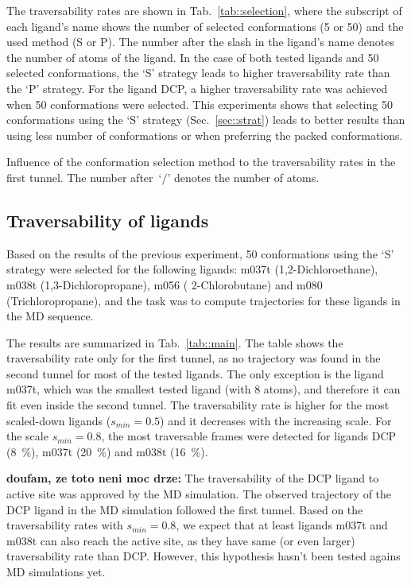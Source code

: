 \documentclass[usletter, 10pt, conference]{ieeeconf} %
\def\smin{s_{min}}
\begin{document}
The traversability rates are shown in Tab.~\ref{tab::selection}, where the subscript of each ligand's 
name shows the number of selected conformations (5 or 50) and the used method (S or P).
The number after the slash in the ligand's name denotes the number of atoms of the ligand.
In the case of both tested ligands and 50 selected conformations, the `S' strategy leads to higher traversability rate than the `P' strategy.
For the ligand DCP, a higher traversability rate was achieved when 50 conformations were selected.
This experiments shows that selecting 50 conformations using the `S' strategy (Sec.~\ref{sec::strat}) leads to better results
than using less number of conformations or when preferring the packed conformations.

\begin{table}
\centering
\caption{\label{tab::selection}
    Influence of the conformation selection method to the traversability rates in the first tunnel.
    The number after~`$/$' denotes the number of atoms.
}
\small
\renewcommand{\tabcolsep}{3pt}
{\small

}
\end{table}





\subsection{Traversability of ligands}

Based on the results of the previous experiment, 50 conformations using the `S' strategy were selected for the following
ligands: m037t (1,2-Dichloroethane), m038t (1,3-Dichloropropane), m056 ( 2-Chlorobutane) and m080 (Trichloropropane), and
the task was to compute trajectories for these ligands in the MD sequence.

The results are summarized in Tab.~\ref{tab::main}.
The table shows the traversability rate only for the first tunnel, as no trajectory was found in the second tunnel for most of the tested ligands.
The only exception is the ligand m037t, which was the smallest tested ligand (with 8 atoms), and therefore it can fit even inside the second tunnel.
The traversability rate is higher for the most scaled-down ligands ($\smin=0.5$) and it decreases with the increasing scale.
For the scale $\smin=0.8$, the most traversable frames were detected for ligands DCP (8~\%), m037t (20~\%) and m038t (16~\%).

{\bf doufam, ze toto neni moc drze:}
The traversability of the DCP ligand to active site was approved by the MD simulation.
The observed trajectory of the DCP ligand in the MD simulation followed the first tunnel.
Based on the traversability rates with $\smin=0.8$, we expect that at least ligands m037t and m038t can also reach the active site, as
they have same (or even larger) traversability rate than DCP.
However, this hypothesis hasn't been tested agains MD simulations yet.
\end{document}
